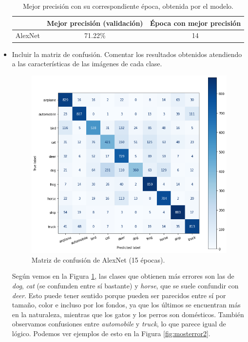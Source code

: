 \documentclass[12pt]{scrartcl}
\begin{document}
\begin{itemize}
\begin{table}[H]
        \centering
        \begin{tabular}{l c l}
        \multicolumn{1}{c}{}             & \cellcolor[HTML]{E3E7EC}Mejor precisión (validación) & \cellcolor[HTML]{E3E7EC} Época con mejor precisión \\ \hline
        \cellcolor[HTML]{E3E7EC} AlexNet & 71.22\%                                              & \multicolumn{1}{c}{14}   \\ 
        \end{tabular}
        \caption{Mejor precisión con su correspondiente época, obtenida por el modelo.}
        \label{table:resultsprecalex}
        \end{table}
\item Incluir la matriz de confusión. Comentar los resultados obtenidos atendiendo a las características de las imágenes de cada clase.

\begin{figure}[H]
        \centering
        \includegraphics[scale=0.58]{confalex1.png}
        \caption{Matriz de confusión de AlexNet (15 épocas).}
        \label{fig:confmatrx2}
\end{figure}
Según vemos en la Figura \ref{fig:confmatrx2}, las clases que obtienen más errores son las de \emph{dog}, \emph{cat} (se confunden entre sí bastante) y \emph{horse}, que se suele confundir con \emph{deer}. Esto puede tener sentido porque pueden ser parecidos entre sí por tamaño, color e incluso por los fondos, ya que los últimos se encuentran más en la naturaleza, mientras que los gatos y los perros son domésticos. También observamos confusiones entre \emph{automobile} y \emph{truck}, lo que parece igual de lógico. Podemos ver ejemplos de esto en la Figura \ref{fig:mosterror2}.


\end{itemize}
\end{document}
